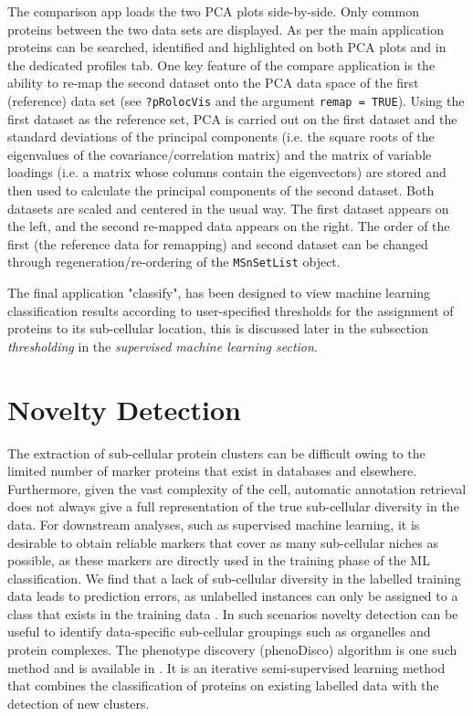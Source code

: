 The comparison app loads the two PCA plots side-by-side. Only common
proteins between the two data sets are displayed. As per the main
application proteins can be searched, identified and highlighted on
both PCA plots and in the dedicated profiles tab. One key feature of
the compare application is the ability to re-map the second dataset
onto the PCA data space of the first (reference) data set (see
\texttt{?pRolocVis} and the argument \texttt{remap = TRUE}). Using the first dataset
as the reference set, PCA is carried out on the first dataset and the
standard deviations of the principal components (i.e. the square roots
of the eigenvalues of the covariance/correlation matrix) and the
matrix of variable loadings (i.e. a matrix whose columns contain the
eigenvectors) are stored and then used to calculate the principal
components of the second dataset. Both datasets are scaled and
centered in the usual way. The first dataset appears on the left, and
the second re-mapped data appears on the right. The order of the first
(the reference data for remapping) and second dataset can be changed
through regeneration/re-ordering of the \texttt{MSnSetList} object.

The final application "classify", has been designed to view machine
learning classification results according to user-specified thresholds
for the assignment of proteins to its sub-cellular location, this is
discussed later in the subsection \textit{thresholding} in the
\textit{supervised machine learning section}.


\section*{Novelty Detection}

The extraction of sub-cellular protein clusters can be difficult owing
to the limited number of marker proteins that exist in databases and
elsewhere. Furthermore, given the vast complexity of the cell,
automatic annotation retrieval does not always give a full
representation of the true sub-cellular diversity in the data. For
downstream analyses, such as supervised machine learning, it is
desirable to obtain reliable markers that cover as many sub-cellular
niches as possible, as these markers are directly used in the training
phase of the ML classification. We find that a lack of sub-cellular
diversity in the labelled training data leads to prediction errors, as
unlabelled instances can only be assigned to a class that exists in
the training data \cite{Breckels:2013}. In such scenarios novelty
detection can be useful to identify data-specific sub-cellular
groupings such as organelles and protein complexes. The phenotype
discovery (phenoDisco) algorithm \cite{Breckels:2013} is one such method
and is available in . It is an iterative
semi-supervised learning method that combines the classification of
proteins on existing labelled data with the detection of new clusters.

